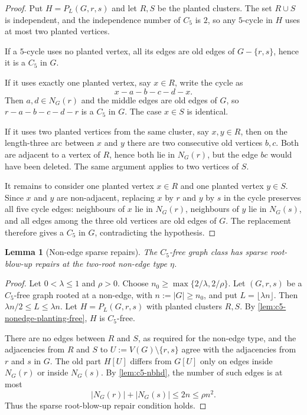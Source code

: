 \documentclass[11pt]{article}
\newtheorem{lemma}[lemma]{Lemma}
\theoremstyle{definition}
\begin{document}
\begin{proof}
Put $H=P_L(G,r,s)$ and let $R,S$ be the planted clusters.  The set
$R\cup S$ is independent, and the independence number of $C_5$ is $2$, so any
$5$-cycle in $H$ uses at most two planted vertices.

If a $5$-cycle uses no planted vertex, all its edges are old edges of
$G-\{r,s\}$, hence it is a $C_5$ in $G$.

If it uses exactly one planted vertex, say $x\in R$, write the cycle as
\[
  x-a-b-c-d-x.
\]
Then $a,d\in N_G(r)$ and the middle edges are old edges of $G$, so
$r-a-b-c-d-r$ is a $C_5$ in $G$.  The case $x\in S$ is identical.

If it uses two planted vertices from the same cluster, say $x,y\in R$, then on
the length-three arc between $x$ and $y$ there are two consecutive old vertices
$b,c$.  Both are adjacent to a vertex of $R$, hence both lie in $N_G(r)$, but
the edge $bc$ would have been deleted.  The same argument applies to two
vertices of $S$.

It remains to consider one planted vertex $x\in R$ and one planted vertex
$y\in S$.  Since $x$ and $y$ are non-adjacent, replacing $x$ by $r$ and $y$ by
$s$ in the cycle preserves all five cycle edges: neighbours of $x$ lie in
$N_G(r)$, neighbours of $y$ lie in $N_G(s)$, and all edges among the three old
vertices are old edges of $G$.  The replacement therefore gives a $C_5$ in
$G$, contradicting the hypothesis.
\end{proof}

\begin{lemma}[Non-edge sparse repairs]\label{lem:c5-nonedge-sparse-repair}
The $C_5$-free graph class has sparse root-blow-up repairs at the two-root
non-edge type $\eta$.
\end{lemma}

\begin{proof}
Let $0<\lambda\le1$ and $\rho>0$.  Choose
$n_0\ge \max\{2/\lambda,2/\rho\}$.  Let $(G,r,s)$ be a $C_5$-free graph rooted at
a non-edge, with $n:=|G|\ge n_0$, and put $L=\lfloor\lambda n\rfloor$.  Then
$\lambda n/2\le L\le\lambda n$.  Let $H=P_L(G,r,s)$ with planted clusters
$R,S$.  By \cref{lem:c5-nonedge-planting-free}, $H$ is $C_5$-free.

There are no edges between $R$ and $S$, as required for the non-edge type, and the
adjacencies from $R$ and $S$ to $U:=V(G)\setminus\{r,s\}$ agree with the adjacencies from
$r$ and $s$ in $G$.  The old part $H[U]$ differs from $G[U]$ only on edges inside
$N_G(r)$ or inside $N_G(s)$.  By \cref{lem:c5-nbhd}, the number of such edges is
at most
\[
  |N_G(r)|+|N_G(s)|\le 2n\le \rho n^2 .
\]
Thus the sparse root-blow-up repair condition holds.
\end{proof}
\end{document}
